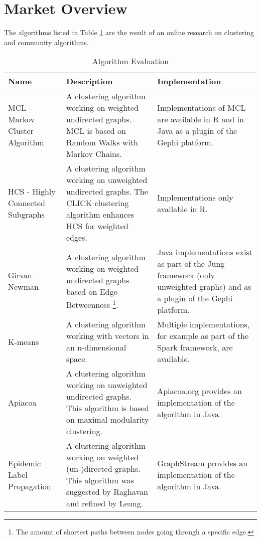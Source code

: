 \section{Market Overview}

The algorithms listed in Table \ref{tab:algorithmEvaluation} are the result of an online research on clustering and community algorithms.

\begin{table}[H]
	\centering
	\caption{Algorithm Evaluation}
	\label{tab:algorithmEvaluation}
	\begin{tabular}{|p{80pt}|p{180pt}|p{130pt}|}
		\hline	
		\textbf{Name} & \textbf{Description} & \textbf{Implementation} \\
		\hline
		MCL - Markov Cluster Algorithm\cite{markovCluster} & A clustering algorithm working on weighted undirected graphs. MCL is based on Random Walks with Markov Chains. & Implementations of MCL are available in R and in Java as a plugin of the Gephi\cite{gephi} platform.  \\
		\hline
		HCS - Highly Connected Subgraphs\cite{hcs} & A clustering algorithm working on unweighted undirected graphs. The CLICK clustering algorithm enhances HCS for weighted edges. & Implementations only available in R.  \\
		\hline
		Girvan–\newline Newman\cite{girvan} & A clustering algorithm working on weighted undirected graphs based on Edge-Betweenness \footnote{The amount of shortest paths between nodes going through a specific edge.}. & Java implementations exist as part of the Jung\cite{jung} framework (only unweighted graphs) and as a plugin of the Gephi\cite{gephi} platform. \\
		\hline	
		K-means\cite{kmeans} & A clustering algorithm working with vectors in an n-dimensional space. & Multiple implementations, for example as part of the Spark\cite{spark} framework, are available. \\
		\hline
		Apiacoa\cite{apiacoa} & A clustering algorithm working on unweighted undirected graphs. This algorithm is based on maximal modularity clustering. & Apiacoa.org provides an implementation of the algorithm in Java. \\
		\hline
		Epidemic Label Propagation\cite{apiacoa} & A clustering algorithm working on weighted (un-)directed graphs. This algorithm was suggested by Raghavan\cite{raghavan} and refined by Leung\cite{leung}. & GraphStream\cite{leungGraphstream} provides an implementation of the algorithm in Java. \\
		\hline
	\end{tabular}
\end{table}

